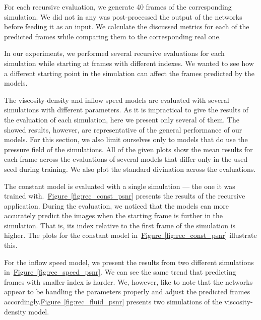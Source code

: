 \documentclass{llncs}
\newcommand{\reffig}[1]{\hyperref[#1]{Figure~\ref*{#1}}}
\begin{document}
For each recursive evaluation, we generate 40 frames of the corresponding simulation. We did not in any was post-processed the output of the networks before feeding it as an input. We calculate the discussed metrics for each of the predicted frames while comparing them to the corresponding real one.

In our experiments, we performed several recursive evaluations for each simulation while starting at frames with different indexes. We wanted to see how a different starting point in the simulation can affect the frames predicted by the models.

The viscosity-density and inflow speed models are evaluated with several simulations with different parameters. As it is impractical to give the results of the evaluation of each simulation, here we present only several of them. The showed results, however, are representative of the general performance of our models. For this section, we also limit ourselves only to models that do use the pressure field of the simulations. All of the given plots show the mean results for each frame across the evaluations of several models that differ only in the used seed during training. We also plot the standard divination across the evaluations.

The constant model is evaluated with a single simulation --- the one it was trained with.~\reffig{fig:rec_const_psnr} presents the results of the recursive application. During the evaluation, we noticed that the models can more accurately predict the images when the starting frame is further in the simulation. That is, its index relative to the first frame of the simulation is higher. The plots for the constant model in~\reffig{fig:rec_const_psnr} illustrate this.

For the inflow speed model, we present the results from two different simulations in~\reffig{fig:rec_speed_psnr}. We can see the same trend that predicting frames with smaller index is harder. We, however, like to note that the networks appear to be handling the parameters properly and adjust the predicted frames accordingly.\reffig{fig:rec_fluid_psnr} presents two simulations of the viscosity-density model.
\end{document}
